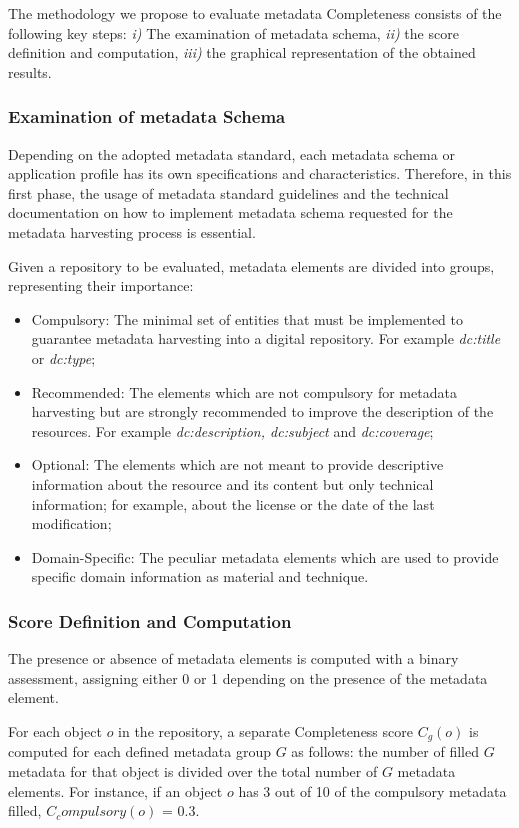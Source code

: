 \documentclass[epsfig,a4paper,12pt,titlepage]{book}
\begin{document}
The methodology we propose to evaluate metadata Completeness consists of the following key steps: \textit{i)} The examination of metadata schema, \textit{ii)} the score definition and computation, \textit{iii)} the graphical representation of the obtained results.

\subsubsection{Examination of metadata Schema}
Depending on the adopted metadata standard, each metadata schema or application profile has its own specifications and characteristics. Therefore, in this first phase, the usage of metadata standard guidelines and the technical documentation on how to implement metadata schema requested for the metadata harvesting process is essential. 

Given a repository to be evaluated, metadata elements are divided into groups, representing their importance:
\begin{itemize}
    \item Compulsory: The minimal set of entities that must be implemented to guarantee metadata harvesting into a digital repository. For example \textit{dc:title} or \textit{dc:type};
    \item Recommended: The elements which are not compulsory for metadata harvesting but are strongly recommended to improve the description of the resources. For example \textit{dc:description, dc:subject} and \textit{dc:coverage};
    \item Optional: The elements which are not meant to provide descriptive information about the resource and its content but only technical information; for example, about the license or the date of the last modification;
    \item Domain-Specific: The peculiar metadata elements which are used to provide specific domain information as material and technique.
\end{itemize} 

\subsubsection{Score Definition and Computation}
The presence or absence of metadata elements is computed with a binary assessment, assigning either 0 or 1 depending on the presence of the metadata element.

For each object \(o\) in the repository, a separate Completeness score \(C_g(o)\) is computed for each defined metadata group \(G\) as follows: the number of filled \(G\) metadata for that object is divided over the total number of \(G\) metadata elements. For instance, if an object \(o\) has 3 out of 10 of the compulsory metadata filled, \(C_compulsory(o)\) = 0.3. 
\end{document}
